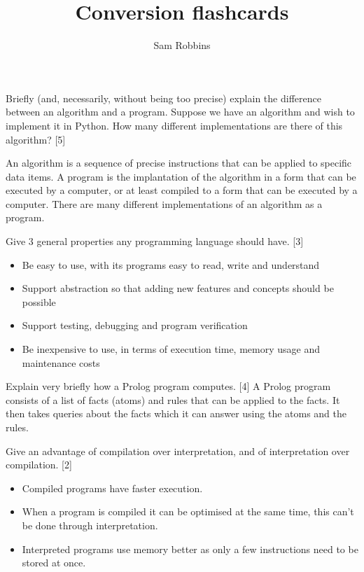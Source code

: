 \documentclass[grid,avery5371]{flashcards}
\title{Conversion flashcards}
\author{Sam Robbins}
\begin{document}
\begin{flashcard}[]{Briefly (and, necessarily, without being too precise) explain the difference between an algorithm and a program. Suppose we have an
algorithm and wish to implement it in Python. How many different
implementations are there of this algorithm? [5]}

An algorithm is a sequence of precise instructions that can be applied to specific data items. A program is the implantation of the algorithm in a form that can be executed by a computer, or at least compiled to a form that can be executed by a computer. There are many different implementations of an algorithm as a program.
\end{flashcard}

\begin{flashcard}[]{Give 3 general properties any programming language should have. [3]}
\normalsize
\begin{itemize}
\itemsep0em 

\item Be easy to use, with its programs easy to read, write and understand
\item Support abstraction so that adding new features and concepts should be possible
\item Support testing, debugging and program verification
\item Be inexpensive to use, in terms of execution time, memory usage and maintenance costs
\end{itemize}
\end{flashcard}

\begin{flashcard}[]{Explain very briefly how a Prolog program computes. [4]}
A Prolog program consists of a list of facts (atoms) and rules that can be applied to the facts. It then takes queries about the facts which it can answer using the atoms and the rules.

\end{flashcard}

\begin{flashcard}[]{Give an advantage of compilation over interpretation, and of interpretation over compilation. [2]}
{\normalsize
\begin{itemize}
\itemsep-0.5em 

\item Compiled programs have faster execution.
\item When a program is compiled it can be optimised at the same time, this can’t be done through interpretation.
\item Interpreted programs use memory better as only a few instructions need to be stored at once.

\end{itemize}}
\end{flashcard}
\end{document}
